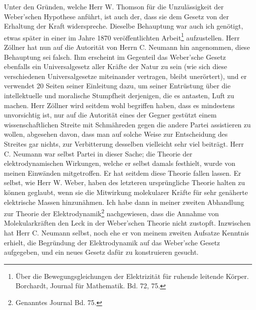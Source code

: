 \documentclass[a4paper, 11pt, oneside, german]{article}
\begin{document}
Unter den Gründen, welche Herr W. Thomson für die Unzulässigkeit der Weber'schen Hypothese anführt, ist auch der, dass sie dem Gesetz von der Erhaltung der Kraft widerspreche. Dieselbe Behauptung war auch ich genötigt, etwas später in einer im Jahre 1870 veröffentlichten Arbeit\footnote{Über die Bewegungsgleichungen der Elektrizität für ruhende leitende Körper. Borchardt, Journal für Mathematik. Bd. 72, 75.} aufzustellen. Herr Zöllner hat nun auf die Autorität von Herrn C. Neumann hin angenommen, diese Behauptung sei falsch. Ihm erscheint im Gegenteil das Weber'sche Gesetz ebenfalls ein Universalgesetz aller Kräfte der Natur zu sein (wie sich diese verschiedenen Universalgesetze miteinander vertragen, bleibt unerörtert), und er verwendet 20 Seiten seiner Einleitung dazu, um seiner Entrüstung über die intellektuelle und moralische Stumpfheit derjenigen, die es antasten, Luft zu machen. Herr Zöllner wird seitdem wohl begriffen haben, dass es mindestens unvorsichtig ist, nur auf die Autorität eines der Gegner gestützt einem wissenschaftlichen Streite mit Schmähreden gegen die andere Partei assistieren zu wollen, abgesehen davon, dass man auf solche Weise zur Entscheidung des Streites gar nichts, zur Verbitterung desselben vielleicht sehr viel beiträgt. Herr C. Neumann war selbst Partei in dieser Sache; die Theorie der elektrodynamischen Wirkungen, welche er selbst damals festhielt, wurde von meinen Einwänden mitgetroffen. Er hat seitdem diese Theorie fallen lassen. Er selbst, wie Herr W. Weber, haben des letzteren ursprüngliche Theorie halten zu können geglaubt, wenn sie die Mitwirkung molekularer Kräfte für sehr genäherte elektrische Massen hinzunähmen. Ich habe dann in meiner zweiten Abhandlung zur Theorie der Elektrodynamik\footnote{Genanntes Journal Bd. 75.} nachgewiesen, dass die Annahme von Molekularkräften den Leck in der Weber'schen Theorie nicht zustopft. Inzwischen hat Herr C. Neumann selbst, noch ehe er von meinem zweiten Aufsatze Kenntnis erhielt, die Begründung der Elektrodynamik auf das Weber'sche Gesetz aufgegeben, und ein neues Gesetz dafür zu konstruieren gesucht.
\end{document}
